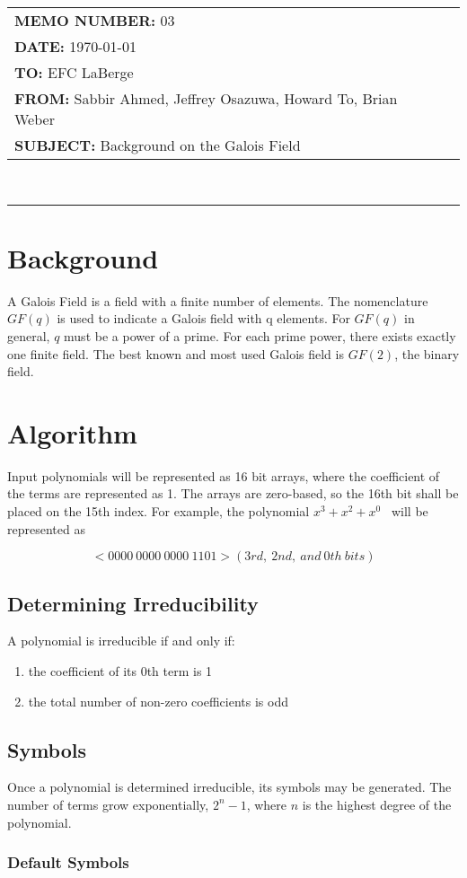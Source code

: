\documentclass[paper=usletter, fontsize=12pt]{article}
\newcommand{\Sabbir}{Sabbir Ahmed}
\newcommand{\Jeffrey}{Jeffrey Osazuwa}
\newcommand{\Howard}{Howard To}
\newcommand{\Brian}{Brian Weber}
\newcommand{\polynomial}{$x^{3}+x^{2}+x^{0}$}
\newcommand{\documentinfo}[5]{
    \begin{centering}
        \parbox{2in}{
        \begin{spacing}{1}
            \begin{flushleft}
                \begin{tabular}{l l}
                    #1 \\
                    #2 \\
                    #3 \\
                    #4 \\
                    #5 \\
                \end{tabular}\\
                \rule{\textwidth}{1pt}
            \end{flushleft}
        \end{spacing}
        }
    \end{centering}
}
\begin{document}
     \documentinfo{\textbf{MEMO NUMBER:} 03}{\textbf{DATE:} \today}{\textbf{TO: } EFC LaBerge}{\textbf{FROM: }\Sabbir, \Jeffrey, \Howard, \Brian}{\textbf{SUBJECT: } Background on the Galois Field}
    \vspace{-0.1in}

    \section{Background}
    A Galois Field is a field with a finite number of elements. The nomenclature $GF(q)$ is used to indicate a Galois field with q elements. For $GF(q)$ in general, $q$ must be a power of a prime. For each prime power, there exists exactly one finite field. The best known and most used Galois field is $GF(2)$, the binary field.

    \section{Algorithm}
    Input polynomials will be represented as 16 bit arrays, where the coefficient of the terms are represented as 1. The arrays are zero-based, so the 16th bit shall be placed on the 15th index. For example, the polynomial \polynomial~ will be represented as

        \[ <0000 \ 0000 \ 0000 \ 1101> (3rd, \ 2nd, \ and \ 0th \ bits) \]

        \subsection{Determining Irreducibility}
        A polynomial is irreducible if and only if:
        \begin{enumerate}
            \item the coefficient of its 0th term is 1
            \item the total number of non-zero coefficients is odd
        \end{enumerate}

        \subsection{Symbols}

            Once a polynomial is determined irreducible, its symbols may be generated. The number of terms grow exponentially, $2^{n}-1$, where $n$ is the highest degree of the polynomial.

            \subsubsection{Default Symbols}
\end{document}
